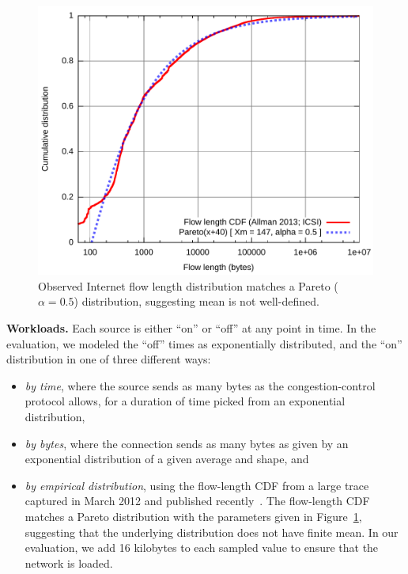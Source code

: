 \begin{figure}
\begin{centering}
\includegraphics[width=\columnwidth]{flowlength.pdf}
\end{centering}
\caption{Observed Internet flow length distribution matches a Pareto ($\alpha = 0.5$)
distribution, suggesting mean is not well-defined.}
\label{f:flowcdf}
\end{figure}

\medskip
\noindent
{\bf Workloads.} Each source is either ``on'' or ``off'' at any point
in time. In the evaluation, we modeled the ``off'' times as exponentially distributed, and
the ``on'' distribution in one of three different ways:
\begin{itemize}
\item {\em by time}, where the source sends as many bytes as the
  congestion-control protocol allows, for a duration of time picked
  from an exponential distribution,
\item {\em by bytes}, where the connection sends as many bytes as
  given by an exponential distribution of a given average and shape,
  and
\item {\em by empirical distribution}, using the flow-length CDF from
  a large trace captured in March 2012 and published
  recently~\cite{allman-ccr-trace}. The flow-length CDF matches a
  Pareto distribution with the parameters given in
  Figure~\ref{f:flowcdf}, suggesting that the underlying distribution
  does not have finite mean. In our evaluation, we add 16 kilobytes to
  each sampled value to ensure that the network is loaded.
\end{itemize}

